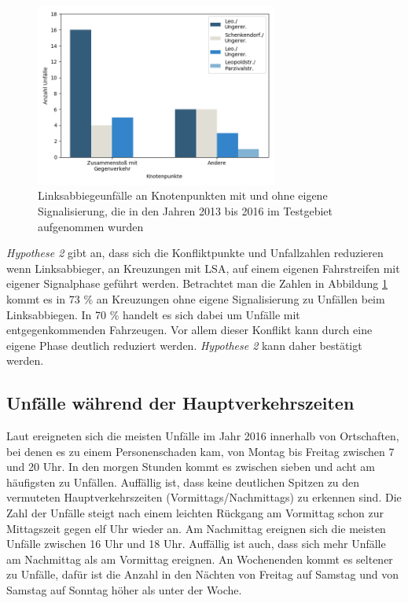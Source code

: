 \begin{savenotes}
	\begin{figure}[H]
		\centering
		\includegraphics[width=8cm,height=6cm]{figures/Unfaelle_Signalphasen}
		\caption[Linksabbiegeunfälle an Knotenpunkten mit und ohne eigene Signalisierung, die in den Jahren 2013 bis 2016 im Testgebiet aufgenommen wurden]{Linksabbiegeunfälle an Knotenpunkten mit und ohne eigene Signalisierung, die in den Jahren 2013 bis 2016 im Testgebiet aufgenommen wurden}\label{fig:Unfaelle_Signalphasen}
	\end{figure}
\end{savenotes}

\textit{Hypothese 2} gibt an, dass sich die Konfliktpunkte und Unfallzahlen reduzieren wenn Linksabbieger, an Kreuzungen mit LSA, auf einem eigenen Fahrstreifen mit eigener Signalphase geführt werden. Betrachtet man die Zahlen in Abbildung \ref{fig:Unfaelle_Signalphasen} kommt es in 73 \% an Kreuzungen ohne eigene Signalisierung zu Unfällen beim Linksabbiegen. In 70 \% handelt es sich dabei um Unfälle mit entgegenkommenden Fahrzeugen. Vor allem dieser Konflikt kann durch eine eigene Phase deutlich reduziert werden. \textit{Hypothese 2} kann daher bestätigt werden.

\subsection{Unfälle während der Hauptverkehrszeiten}
Laut \Textcite[S. 80f]{StatistischesBundesamt.2017} ereigneten sich die meisten Unfälle im Jahr 2016 innerhalb von Ortschaften, bei denen es zu einem Personenschaden kam, von Montag bis Freitag zwischen 7 und 20 Uhr. In den morgen Stunden kommt es zwischen sieben und acht am häufigsten zu Unfällen. Auffällig ist, dass keine deutlichen Spitzen zu den vermuteten Hauptverkehrszeiten (Vormittags/Nachmittags) zu erkennen sind.  Die Zahl der Unfälle steigt nach einem leichten Rückgang am Vormittag schon zur Mittagszeit gegen elf Uhr wieder an. Am Nachmittag ereignen sich die meisten Unfälle zwischen 16 Uhr und 18 Uhr. Auffällig ist auch, dass sich mehr Unfälle am Nachmittag als am Vormittag ereignen. An Wochenenden kommt es seltener zu Unfälle, dafür ist die Anzahl in den Nächten von Freitag auf Samstag und von Samstag auf Sonntag höher als unter der Woche.

